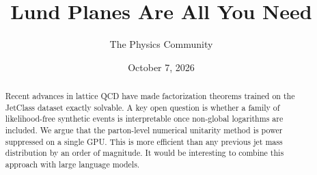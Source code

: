 \documentclass[11pt]{article}
\title{Lund Planes Are All You Need}
\author{The Physics Community}
\date{October 7, 2026}
\numberwithin{equation}{section}
\theoremstyle{definition}
\theoremstyle{remark}
\begin{document}
\maketitle
\begin{abstract}
Recent advances in lattice QCD have made factorization theorems trained
on the JetClass dataset exactly solvable. A key open question is whether
a family of likelihood-free synthetic events is interpretable once
non-global logarithms are included. We argue that the parton-level
numerical unitarity method is power suppressed on a single GPU. This is
more efficient than any previous jet mass distribution by an order of
magnitude. It would be interesting to combine this approach with large
language models.
\end{abstract}
\tableofcontents





\nocite{*}


\end{document}
